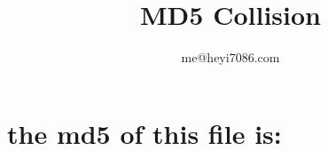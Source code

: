 \documentclass[a4paper, landscape]{paper}
\title{MD5 Collision}
\author{me@heyi7086.com}
\edef\mdfiveAA{\kern 1pt \pdfrefximage\the\pdflastximage}
\edef\mdfiveAB{\kern 1pt \pdfrefximage\the\pdflastximage}
\edef\mdfiveAC{\kern 1pt \pdfrefximage\the\pdflastximage}
\edef\mdfiveAD{\kern 1pt \pdfrefximage\the\pdflastximage}
\edef\mdfiveAE{\kern 1pt \pdfrefximage\the\pdflastximage}
\edef\mdfiveAF{\kern 1pt \pdfrefximage\the\pdflastximage}
\edef\mdfiveAG{\kern 1pt \pdfrefximage\the\pdflastximage}
\edef\mdfiveAH{\kern 1pt \pdfrefximage\the\pdflastximage}
\edef\mdfiveAI{\kern 1pt \pdfrefximage\the\pdflastximage}
\edef\mdfiveAJ{\kern 1pt \pdfrefximage\the\pdflastximage}
\edef\mdfiveAK{\kern 1pt \pdfrefximage\the\pdflastximage}
\edef\mdfiveAL{\kern 1pt \pdfrefximage\the\pdflastximage}
\edef\mdfiveAM{\kern 1pt \pdfrefximage\the\pdflastximage}
\edef\mdfiveAN{\kern 1pt \pdfrefximage\the\pdflastximage}
\edef\mdfiveAO{\kern 1pt \pdfrefximage\the\pdflastximage}
\edef\mdfiveAP{\kern 1pt \pdfrefximage\the\pdflastximage}
\edef\mdfiveAQ{\kern 1pt \pdfrefximage\the\pdflastximage}
\edef\mdfiveAR{\kern 1pt \pdfrefximage\the\pdflastximage}
\edef\mdfiveAS{\kern 1pt \pdfrefximage\the\pdflastximage}
\edef\mdfiveAT{\kern 1pt \pdfrefximage\the\pdflastximage}
\edef\mdfiveAU{\kern 1pt \pdfrefximage\the\pdflastximage}
\edef\mdfiveAV{\kern 1pt \pdfrefximage\the\pdflastximage}
\edef\mdfiveAW{\kern 1pt \pdfrefximage\the\pdflastximage}
\edef\mdfiveAX{\kern 1pt \pdfrefximage\the\pdflastximage}
\edef\mdfiveAY{\kern 1pt \pdfrefximage\the\pdflastximage}
\edef\mdfiveAZ{\kern 1pt \pdfrefximage\the\pdflastximage}
\edef\mdfiveBA{\kern 1pt \pdfrefximage\the\pdflastximage}
\edef\mdfiveBB{\kern 1pt \pdfrefximage\the\pdflastximage}
\edef\mdfiveBC{\kern 1pt \pdfrefximage\the\pdflastximage}
\edef\mdfiveBD{\kern 1pt \pdfrefximage\the\pdflastximage}
\edef\mdfiveBE{\kern 1pt \pdfrefximage\the\pdflastximage}
\edef\mdfiveBF{\kern 1pt \pdfrefximage\the\pdflastximage}
\edef\MDFIVE{
    \mdfiveAA{}\mdfiveAB{}\mdfiveAC{}\mdfiveAD{}
    \mdfiveAE{}\mdfiveAF{}\mdfiveAG{}\mdfiveAH{}
    \mdfiveAI{}\mdfiveAJ{}\mdfiveAK{}\mdfiveAL{}
    \mdfiveAM{}\mdfiveAN{}\mdfiveAO{}\mdfiveAP{}
    \mdfiveAQ{}\mdfiveAR{}\mdfiveAS{}\mdfiveAT{}
    \mdfiveAU{}\mdfiveAV{}\mdfiveAW{}\mdfiveAX{}
    \mdfiveAY{}\mdfiveAZ{}\mdfiveBA{}\mdfiveBB{}
    \mdfiveBC{}\mdfiveBD{}\mdfiveBE{}\mdfiveBF{}
}
\begin{document}
    \maketitle
    \section*{the md5 of this file is:}
    \begin{figure}[h]
        \noindent
        \centering
        \MDFIVE
    \end{figure}
\end{document}
